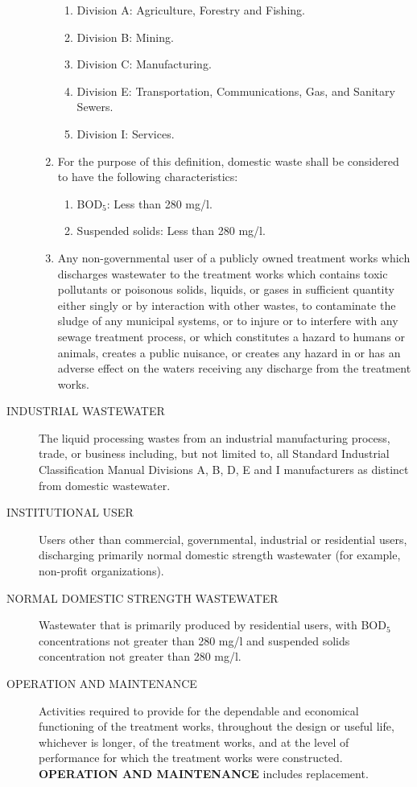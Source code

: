 \begin{description}
\begin{enumerate}
    \begin{enumerate}[{\indent}a)]
        \item Division A:  Agriculture, Forestry and Fishing.
        \item Division B:  Mining.
        \item Division C:  Manufacturing.
        \item Division E:  Transportation, Communications, Gas, and Sanitary Sewers.
        \item Division I:  Services.
    \end{enumerate}
\item For the purpose of this definition, domestic waste shall be considered to have the following characteristics:
    \begin{enumerate}[{\indent}a)]
        \item BOD$_{5}$: Less than 280 mg/l.
        \item Suspended solids:  Less than 280 mg/l.
    \end{enumerate}
\item Any non-governmental user of a publicly owned treatment works which discharges wastewater to the treatment works which contains toxic pollutants or poisonous solids, liquids, or gases in sufficient quantity either singly or by interaction with other wastes, to contaminate the sludge of any municipal systems, or to injure or to interfere with any sewage treatment process, or which constitutes a hazard to humans or animals, creates a public nuisance, or creates any hazard in or has an adverse effect on the waters receiving any discharge from the treatment works.
\end{enumerate}
\item[INDUSTRIAL WASTEWATER] The liquid processing wastes from an industrial manufacturing process, trade, or business including, but not limited to, all Standard Industrial Classification Manual Divisions A, B, D, E and I manufacturers as distinct from domestic wastewater.
\item[INSTITUTIONAL USER] Users other than commercial, governmental, industrial or residential users, discharging primarily normal domestic strength wastewater (for example, non-profit organizations).
\item[NORMAL DOMESTIC STRENGTH WASTEWATER] Wastewater that is primarily produced by residential users, with BOD$_{5}$ concentrations not greater than 280 mg/l and suspended solids concentration not greater than 280 mg/l.
\item[OPERATION AND MAINTENANCE] Activities required to provide for the dependable and economical functioning of the treatment works, throughout the design or useful life, whichever is longer, of the treatment works, and at the level of performance for which the treatment works were constructed.  \textbf{OPERATION AND MAINTENANCE} includes replacement.

\end{description}
